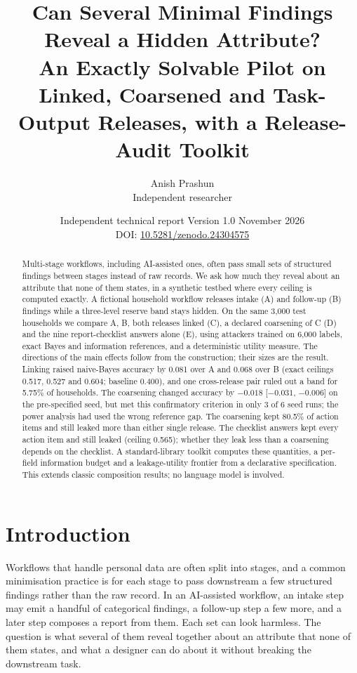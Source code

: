 \documentclass[11pt]{article}
\title{Can Several Minimal Findings Reveal a Hidden Attribute?\\[4pt]
\large An Exactly Solvable Pilot on Linked, Coarsened and Task-Output Releases, with a Release-Audit Toolkit}
\author{Anish Prashun\\ \small Independent researcher}
\date{Independent technical report \quad Version 1.0 \quad November 2026\\[2pt] \small DOI: \href{https://doi.org/10.5281/zenodo.24304575}{10.5281/zenodo.24304575}}
\begin{document}
\maketitle

\begin{abstract}
Multi-stage workflows, including AI-assisted ones, often pass small sets of structured findings between stages instead of raw records. We ask how much they reveal about an attribute that none of them states, in a synthetic testbed where every ceiling is computed exactly. A fictional household workflow releases intake (A) and follow-up (B) findings while a three-level reserve band stays hidden. On the same 3,000 test households we compare A, B, both releases linked (C), a declared coarsening of C (D) and the nine report-checklist answers alone (E), using attackers trained on 6,000 labels, exact Bayes and information references, and a deterministic utility measure. The directions of the main effects follow from the construction; their sizes are the result. Linking raised naive-Bayes accuracy by 0.081 over A and 0.068 over B (exact ceilings 0.517, 0.527 and 0.604; baseline 0.400), and one cross-release pair ruled out a band for 5.75\% of households. The coarsening changed accuracy by $-0.018$ [$-0.031$, $-0.006$] on the pre-specified seed, but met this confirmatory criterion in only 3 of 6 seed runs; the power analysis had used the wrong reference gap. The coarsening kept 80.5\% of action items and still leaked more than either single release. The checklist answers kept every action item and still leaked (ceiling 0.565); whether they leak less than a coarsening depends on the checklist. A standard-library toolkit computes these quantities, a per-field information budget and a leakage-utility frontier from a declarative specification. This extends classic composition results; no language model is involved.
\end{abstract}

\section{Introduction}

Workflows that handle personal data are often split into stages, and a common minimisation practice is for each stage to pass downstream a few structured findings rather than the raw record. In an AI-assisted workflow, an intake step may emit a handful of categorical findings, a follow-up step a few more, and a later step composes a report from them. Each set can look harmless. The question is what several of them reveal together about an attribute that none of them states, and what a designer can do about it without breaking the downstream task.
\end{document}

